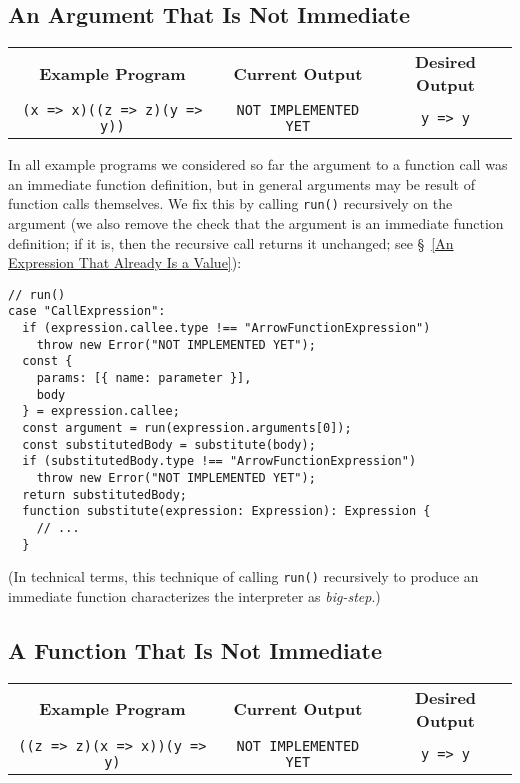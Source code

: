\documentclass[12pt, oneside]{book}
\begin{document}
\subsection{An Argument That Is Not Immediate}
\label{An Argument That Is Not Immediate}

\begin{center}
\begin{tabular}{c|c|c}
\textbf{Example Program} & \textbf{Current Output} & \textbf{Desired Output} \\
\texttt{(x => x)((z => z)(y => y))} & \texttt{NOT IMPLEMENTED YET} & \texttt{y => y} \\
\end{tabular}
\end{center}

\noindent In all example programs we considered so far the argument to a function call was an immediate function definition, but in general arguments may be result of function calls themselves. We fix this by calling \texttt{run()} recursively on the argument (we also remove the check that the argument is an immediate function definition; if it is, then the recursive call returns it unchanged; see §~\ref{An Expression That Already Is a Value}):

\begin{verbatim}
// run()
case "CallExpression":
  if (expression.callee.type !== "ArrowFunctionExpression")
    throw new Error("NOT IMPLEMENTED YET");
  const {
    params: [{ name: parameter }],
    body
  } = expression.callee;
  const argument = run(expression.arguments[0]);
  const substitutedBody = substitute(body);
  if (substitutedBody.type !== "ArrowFunctionExpression")
    throw new Error("NOT IMPLEMENTED YET");
  return substitutedBody;
  function substitute(expression: Expression): Expression {
    // ...
  }
\end{verbatim}

(In technical terms, this technique of calling \texttt{run()} recursively to produce an immediate function characterizes the interpreter as \emph{big-step}.)

\subsection{A Function That Is Not Immediate}
\label{A Function That Is Not Immediate}

\begin{center}
\begin{tabular}{c|c|c}
\textbf{Example Program} & \textbf{Current Output} & \textbf{Desired Output} \\
\texttt{((z => z)(x => x))(y => y)} & \texttt{NOT IMPLEMENTED YET} & \texttt{y => y} \\
\end{tabular}
\end{center}
\end{document}
